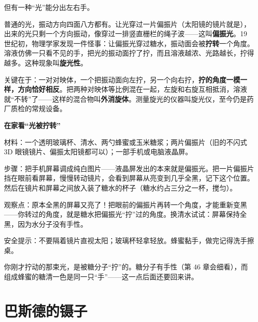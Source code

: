 但有一种“光”能分出左右手。

普通的光，振动方向四面八方都有。让光穿过一片偏振片（太阳镜的镜片就是），出来的光只剩一个方向振动，像穿过一排竖直栅栏的绳子波——这叫\textbf{偏振光}。19 世纪初，物理学家发现一件怪事：让偏振光穿过糖水，振动面会被\textbf{拧转}一个角度。溶液仿佛一只看不见的手，把光的振动面拧了拧，而且溶液越浓、光路越长，拧得越多。这种现象叫\textbf{旋光性}。

关键在于：一对对映体，一个把振动面向左拧，另一个向右拧，\textbf{拧的角度一模一样，方向恰好相反}。把两种对映体等比例混在一起，左旋和右旋互相抵消，溶液就“不转”了——这样的混合物叫\textbf{外消旋体}。测量旋光的仪器叫旋光仪，至今仍是药厂质检的常规设备。

\begin{shiyan}
\textbf{在家看“光被拧转”}

材料：一个透明玻璃杯、清水、两勺蜂蜜或玉米糖浆；两片偏振片（旧的不闪式 3D 眼镜镜片、偏振太阳镜都可以）；一部手机或电脑液晶屏。

步骤：把手机屏幕调成纯白图片——液晶屏发出的本来就是偏振光。把一片偏振片挡在眼前看屏幕，慢慢转动镜片，会看到屏幕从亮变到几乎全黑，记下这个位置。然后在镜片和屏幕之间放入装了糖水的杯子（糖水约占三分之一杯，搅匀）。

观察点：原本全黑的屏幕又亮了！把眼前的偏振片再转一个角度，才能重新变黑——你转过的角度，就是糖水把偏振光“拧”过的角度。换清水试试：屏幕保持全黑，因为水分子没有手性。

安全提示：不要隔着镜片直视太阳；玻璃杯轻拿轻放。蜂蜜黏手，做完记得洗手擦桌。
\end{shiyan}

你刚才拧动的那束光，是被糖分子“拧”的。糖分子有手性（第 46 章会细看），而组成蜂蜜的糖清一色是同一只“手”——这一点后面还要回来讲。

\section{巴斯德的镊子}

